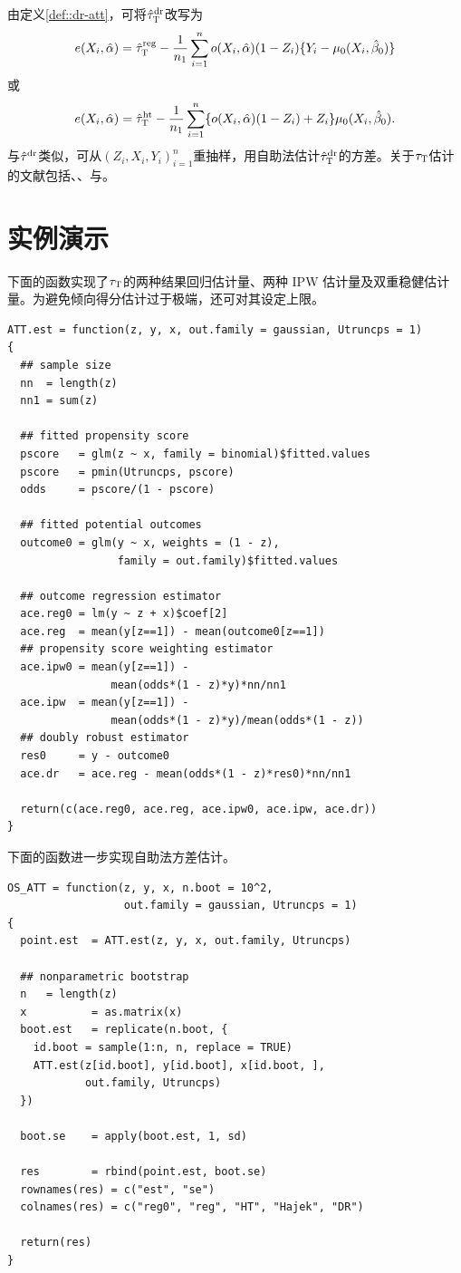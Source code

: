 由定义\ref{def::dr-att}，可将$\hat{\tau}_\textsc{T}^\textup{dr}$改写为
$$
e(X_i, \hat{\alpha})
= \hat{\tau}_\textsc{T}^\textup{reg}
 - \frac{1}{n_1} \sum_{i=1}^n  o(X_i,\hat{\alpha})  (1-Z_i)\{ Y_i-\mu_0(X_i, \hat{\beta}_0) \}    
$$
或
$$
e(X_i, \hat{\alpha})
= \hat{\tau}_\textsc{T}^\textup{ht} 
- \frac{1}{n_1} \sum_{i=1}^n  \{ o(X_i,\hat{\alpha}) (1-Z_i) + Z_i  \} \mu_0(X_i, \hat{\beta}_0)  .
$$
与$\hat{\tau}^\textup{dr}  $类似，可从$(Z_i, X_i, Y_i)_{i=1}^n$重抽样，用自助法估计$\hat{\tau}_\textsc{T}^\textup{dr}  $的方差。关于$\tau_\textsc{T}$估计的文献包括\citet{hahn1998role}、\citet{mercatanti2014debit}、\citet{shinozaki2015brief}与\citet{yang2018asymptotic}。 



\section{实例演示}
\label{sec::dr-att-example}


下面的函数实现了$\tau_\textsc{T}$的两种结果回归估计量、两种 IPW 估计量及双重稳健估计量。为避免倾向得分估计过于极端，还可对其设定上限。 

\begin{lstlisting}
ATT.est = function(z, y, x, out.family = gaussian, Utruncps = 1)
{
  ## sample size
  nn  = length(z)
  nn1 = sum(z)
  
  ## fitted propensity score
  pscore   = glm(z ~ x, family = binomial)$fitted.values
  pscore   = pmin(Utruncps, pscore)
  odds     = pscore/(1 - pscore)
  
  ## fitted potential outcomes
  outcome0 = glm(y ~ x, weights = (1 - z), 
                 family = out.family)$fitted.values
  
  ## outcome regression estimator
  ace.reg0 = lm(y ~ z + x)$coef[2]
  ace.reg  = mean(y[z==1]) - mean(outcome0[z==1]) 
  ## propensity score weighting estimator
  ace.ipw0 = mean(y[z==1]) - 
                mean(odds*(1 - z)*y)*nn/nn1
  ace.ipw  = mean(y[z==1]) - 
                mean(odds*(1 - z)*y)/mean(odds*(1 - z))
  ## doubly robust estimator
  res0     = y - outcome0
  ace.dr   = ace.reg - mean(odds*(1 - z)*res0)*nn/nn1
  
  return(c(ace.reg0, ace.reg, ace.ipw0, ace.ipw, ace.dr))     
}
\end{lstlisting}

下面的函数进一步实现自助法方差估计。 

\begin{lstlisting}
OS_ATT = function(z, y, x, n.boot = 10^2,
                  out.family = gaussian, Utruncps = 1)
{
  point.est  = ATT.est(z, y, x, out.family, Utruncps)
  
  ## nonparametric bootstrap
  n   = length(z)
  x          = as.matrix(x)
  boot.est   = replicate(n.boot, {
    id.boot = sample(1:n, n, replace = TRUE)
    ATT.est(z[id.boot], y[id.boot], x[id.boot, ], 
            out.family, Utruncps)
  })
  
  boot.se    = apply(boot.est, 1, sd)
  
  res        = rbind(point.est, boot.se)
  rownames(res) = c("est", "se")
  colnames(res) = c("reg0", "reg", "HT", "Hajek", "DR")
  
  return(res)
}
\end{lstlisting}

